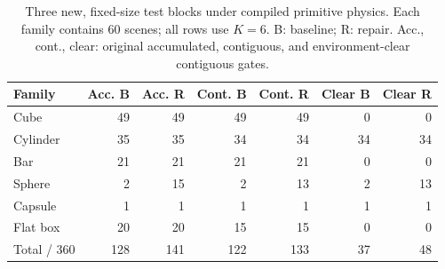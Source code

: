 \begin{table}[H]\centering\small
\caption{Three new, fixed-size test blocks under compiled primitive physics. Each family contains 60 scenes; all rows use $K=6$. B: baseline; R: repair. Acc., cont., clear: original accumulated, contiguous, and environment-clear contiguous gates.}
\label{tab:v3-families}
\begin{tabular}{lrrrrrr}\toprule
Family & Acc. B & Acc. R & Cont. B & Cont. R & Clear B & Clear R \\\midrule
Cube & 49 & 49 & 49 & 49 & 0 & 0 \\
Cylinder & 35 & 35 & 34 & 34 & 34 & 34 \\
Bar & 21 & 21 & 21 & 21 & 0 & 0 \\
Sphere & 2 & 15 & 2 & 13 & 2 & 13 \\
Capsule & 1 & 1 & 1 & 1 & 1 & 1 \\
Flat box & 20 & 20 & 15 & 15 & 0 & 0 \\
Total / 360 & 128 & 141 & 122 & 133 & 37 & 48 \\
\bottomrule\end{tabular}\end{table}
